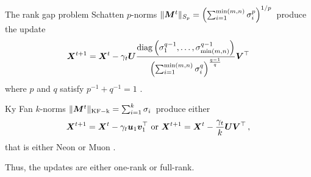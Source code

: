 \documentclass[aspectratio=169]{beamer}
\newcommand{\norm}[1]{\lVert #1\rVert}
\DeclarePairedDelimiter{\normkfk}{\|}{\|_\mathrm{KF-k}}
\DeclareMathOperator{\diag}{diag}
\begin{document}
\begin{frame}{The rank gap problem}
Schatten $p$-norms $\norm{\mM^t}_{S_p} = \left(\sum_{i=1}^{\min(m, n)}\sigma_i^p\right)^{1/p}\,$
  produce the update
 \[
 \mX^{t+1} = \mX^t - \gamma_t \mU \frac{\diag\left(\sigma_1^{q-1},\dots, \sigma_{\min(m,n)}^{q-1}\right)}{\left(\sum_{i=1}^{\min(m,n)}{\sigma_i^q}\right)^{\frac{q-1}{q}}}\mV^\top
 \]
 where $p$ and $q$ satisfy $p^{-1} + q^{-1} = 1$ \citep{cesista2025schattenp}.

 \vspace{0.5em}
 Ky Fan $k$-norms $\normkfk{\mM^t}= \sum_{i=1}^{k}\sigma_i\,$ produce either
 \[
 {\bm{X}}^{t+1} = {\bm{X}}^{t} - \gamma_t {\bm{u}}_1 {\bm{v}}_1^\top\text{ or }{\bm{X}}^{t+1} = {\bm{X}}^{t} - \frac{\gamma_t}{k}{\bm{U}} {\bm{V}}^\top\,,
 \]
that is either Neon or Muon \citep{kravatskiy2025fanions}.

\vspace{0.5em}

Thus, the updates are either one-rank or full-rank.

\end{frame}
\end{document}
